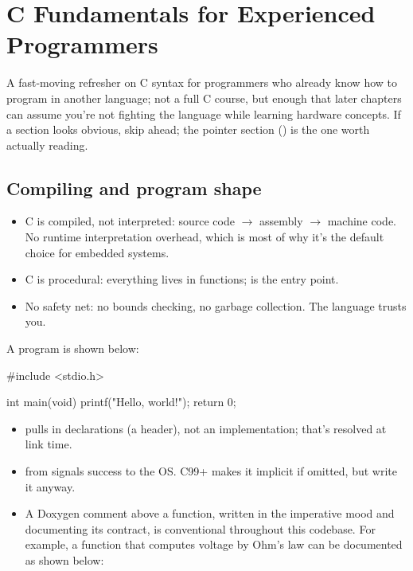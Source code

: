 
\section{C Fundamentals for Experienced Programmers}
\label{c1:sec:fundamentals}\label{c1:app:a}
A fast-moving refresher on C syntax for programmers who already know how to program in another
language; not a full C course, but enough that later chapters can assume you're not fighting the
language while learning hardware concepts. If a section looks obvious, skip ahead; the pointer
section () is the one worth actually reading.

\subsection{Compiling and program shape}
\label{c1:a:1}
\begin{itemize}
  \item C is compiled, not interpreted: source code $\rightarrow$ assembly $\rightarrow$ machine
    code. No runtime interpretation overhead, which is most of why it's the default choice for
    embedded systems.
  \item C is procedural: everything lives in functions;  is the entry point.
  \item No safety net: no bounds checking, no garbage collection. The language trusts you.
\end{itemize}
A  program is shown below:

\begin{ccode}
#include <stdio.h>

int main(void)
{
    printf("Hello, world!\n");
    return 0;
}
\end{ccode}

\begin{itemize}
  \item {} pulls in declarations (a header), not an implementation; that's
    resolved at link time.
  \item {} from  signals success to the OS. C99+ makes it implicit if
    omitted, but write it anyway.
  \item A Doxygen comment above a function, written in the imperative mood and documenting its
    contract, is conventional throughout this codebase. For example, a function that computes
    voltage by Ohm's law can be documented as shown below:
\end{itemize}

